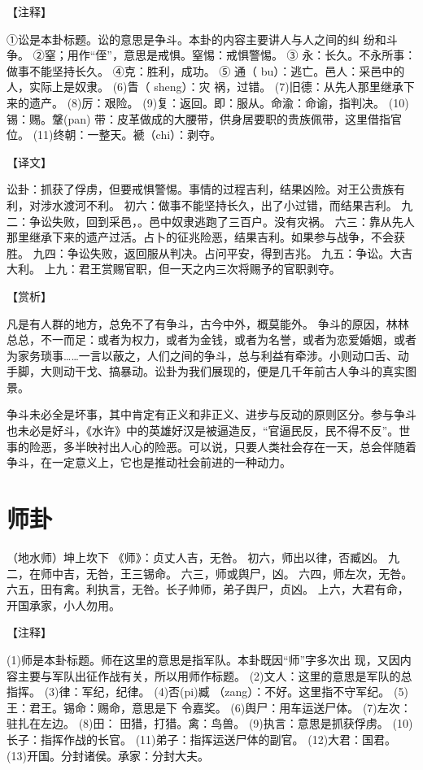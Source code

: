 \documentclass[a4paper,12pt,UTF8,twoside]{ctexbook}
\begin{document}
【注释】

①讼是本卦标题。讼的意思是争斗。本卦的内容主要讲人与人之间的纠 纷和斗争。
②窒；用作“侄”，意思是戒惧。窒惕：戒惧警惕。
③ 永：长久。不永所事：做事不能坚持长久。
④克：胜利，成功。
⑤ 通（ bu）：逃亡。邑人：采邑中的人，实际上是奴隶。
(6)眚（ sheng）：灾 祸，过错。
(7)旧德：从先人那里继承下来的遗产。
(8)厉：艰险。
(9)复：返回。即：服从。命渝：命谕，指判决。
(10)锡：赐。鞶(pan) 带：皮革做成的大腰带，供身居要职的贵族佩带，这里借指官位。
(11)终朝：一整天。褫（chi）：剥夺。

【译文】

讼卦：抓获了俘虏，但要戒惧警惕。事情的过程吉利，结果凶险。对王公贵族有利，对涉水渡河不利。
初六：做事不能坚持长久，出了小过错，而结果吉利。
九二：争讼失败，回到采邑，。邑中奴隶逃跑了三百户。没有灾祸。
六三：靠从先人那里继承下来的遗产过活。占卜的征兆险恶，结果吉利。如果参与战争，不会获胜。
九四：争讼失败，返回服从判决。占问平安，得到吉兆。
九五：争讼。大吉大利。
上九：君王赏赐官职，但一天之内三次将赐予的官职剥夺。

【赏析】

凡是有人群的地方，总免不了有争斗，古今中外，概莫能外。 争斗的原因，林林总总，不一而足：或者为权力，或者为金钱，或者为名誉，或者为恋爱婚姻，或者为家务琐事……一言以蔽之，人们之间的争斗，总与利益有牵涉。小则动口舌、动手脚，大则动干戈、搞暴动。讼卦为我们展现的，便是几千年前古人争斗的真实图景。

争斗未必全是坏事，其中肯定有正义和非正义、进步与反动的原则区分。参与争斗也未必是好斗，《水许》中的英雄好汉是被逼造反，“官逼民反，民不得不反”。世事的险恶，多半映衬出人心的险恶。可以说，只要人类社会存在一天，总会伴随着争斗，在一定意义上，它也是推动社会前进的一种动力。

\chapter{师卦}

（地水师）坤上坎下
《师》：贞丈人吉，无咎。
初六，师出以律，否臧凶。
九二，在师中吉，无咎，王三锡命。
六三，师或舆尸，凶。
六四，师左次，无咎。
六五，田有禽。利执言，无咎。长子帅师，弟子舆尸，贞凶。
上六，大君有命，开国承家，小人勿用。

【注释】

(1)师是本卦标题。师在这里的意思是指军队。本卦既因“师”字多次出 现，又因内容主要与军队出征作战有关，所以用师作标题。
(2)文人：这里的意思是军队的总指挥。
(3)律：军纪，纪律。
(4)否(pi)臧 （zang）：不好。这里指不守军纪。
(5)王：君王。锡命：赐命，意思是下 令嘉奖。
(6)舆尸：用车运送尸体。
(7)左次：驻扎在左边。
(8)田： 田猎，打猎。禽：鸟兽。
(9)执言：意思是抓获俘虏。
(10)长子：指挥作战的长官。
(11)弟子：指挥运送尸体的副官。
(12)大君：国君。
(13)开国。分封诸侯。承家：分封大夫。
\end{document}
